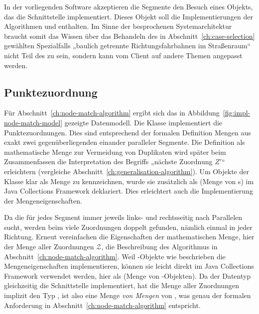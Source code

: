 \documentclass[../main/thesis.tex]{subfiles}
\begin{document}
In der vorliegenden Software akzeptieren die Segmente den Besuch eines Objekts, das die Schnittstelle  implementiert.
Dieses Objekt soll die Implementierungen der Algorithmen  und  enthalten.
Im Sinne der besprochenen Systemarchitektur braucht somit das Wissen über das Behandeln des in Abschnitt~\ref{ch:case-selection} gewählten Spezialfalls „baulich getrennte Richtungsfahrbahnen im Straßenraum“ nicht Teil des  zu sein, sondern kann vom Client auf andere Themen angepasst werden.



\subsection{Punktezuordnung}
\label{ch:impl-node-match}

Für Abschnitt~\ref{ch:node-match-algorithm} ergibt sich das in Abbildung~\ref{fig:impl-node-match-model} gezeigte Datenmodell.
Die Klasse  implementiert die Punktezuordnungen.
Dies sind entsprechend der formalen Definition Mengen aus exakt zwei gegenüberliegenden  einander paralleler Segmente.
Die Definition als mathematische Menge zur Vermeidung von Duplikaten wird später beim Zusammenfassen die Interpretation des Begriffs „nächste Zuordnung $Z'$“ erleichtern (vergleiche Abschnitt~\ref{ch:generalisation-algorithm}).
Um Objekte der Klasse  klar als Menge zu kennzeichnen, wurde sie zusätzlich als  (Menge von s) im Java Collections Framework deklariert.
Dies erleichtert auch die Implementierung der Mengeneigenschaften.


Da die  für jedes Segment immer jeweils links- und rechtsseitig nach Parallelen sucht, werden beim  viele Zuordnungen doppelt gefunden, nämlich einmal in jeder Richtung.
Erneut vereinfachen die Eigenschaften der mathematischen Menge, hier der Menge aller Zuordnungen $\mathcal{Z}$, die Beschreibung des Algorithmus in Abschnitt~\ref{ch:node-match-algorithm}.
Weil -Objekte wie beschrieben die Mengeneigenschaften implementieren, können sie leicht direkt im Java Collections Framework verwendet werden, hier als  (Menge von -Objekten).
Da der Datentyp  gleichzeitig die Schnittstelle  implementiert, hat die Menge aller Zuordnungen implizit den Typ , ist also eine Menge \emph{von Mengen} von , was genau der formalen Anforderung in Abschnitt~\ref{ch:node-match-algorithm} entspricht.
\end{document}
